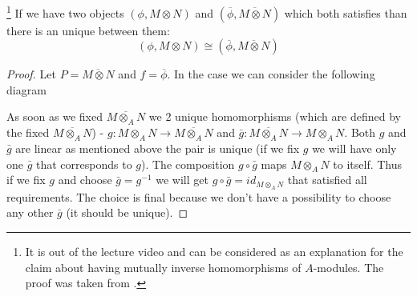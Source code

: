 \begin{lemma}
  \footnote{
    It is out of the lecture video and can be considered as an
    explanation for the claim about having mutually inverse
    homomorphisms of $A$-modules. The proof was taken from
    \cite{bib:KeithConradTensorProduct1}.
  }
  If we have two objects $\left(\phi, M \otimes N\right)$
  and $\left(\overline{\phi},\overline{M \otimes N}\right)$
  which both satisfies  than there is
  an unique  between them: 
  \[
  \left(\phi, M \otimes N\right) \cong \left(\overline{\phi},
  \overline{M \otimes N}\right)
  \]
\begin{proof}
Let $P = \overline{M \otimes N}$ and $f =
\overline{\phi}$. In 
the case we can consider the following diagram


As soon as we fixed $\overline{ M \otimes_A N}$
we 2 unique homomorphisms (which are defined by the fixed
$\overline{ M \otimes_A N}$) - 
$g :  M \otimes_A N \to \overline{ M \otimes_A N}$
and
$\bar{g} :  \overline{M \otimes_A N} \to M \otimes_A N$.
Both $g$ and $\bar{g}$ are linear as mentioned above the pair is
unique (if we fix $g$ we will have only one $\bar{g}$ that corresponds
to $g$). The composition $g \circ \bar{g}$ maps $M \otimes_A N$ to
itself. Thus if we fix $g$ and choose $\bar{g} = g^{-1}$ we will get
$g \circ \bar{g} = id_{M \otimes_A N}$ that satisfied all
requirements. The choice is final because we don't have a possibility
to choose any other $\bar{g}$ (it should be unique).


\end{proof}
\end{lemma}
